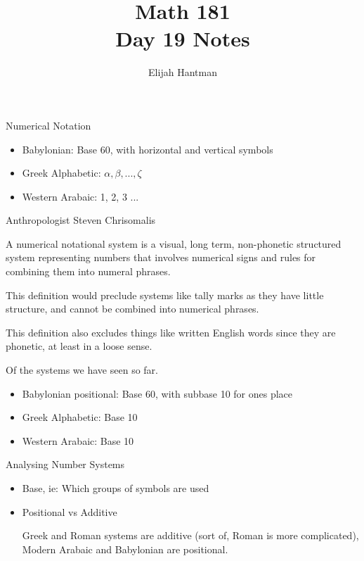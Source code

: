 \documentclass{report}
\title{\Huge{Math 181}\\Day 19 Notes}
\author{\huge{Elijah Hantman}}
\date{}
\begin{document}
\maketitle
\newpage

\begin{description}
    \item {\large Numerical Notation} 
        \begin{mdframed}
           \begin{itemize}
               \item Babylonian: Base 60, with horizontal and vertical symbols
               \item Greek Alphabetic: $\alpha, \beta, ... , \zeta$
               \item Western Arabaic: 1, 2, 3 ... 
           \end{itemize} 

           Anthropologist Steven Chrisomalis
           \begin{mdframed}
              A numerical notational system is a visual,
              long term, non-phonetic structured system
              representing numbers that involves numerical
              signs and rules for combining them into
              numeral phrases.
           \end{mdframed}

           This definition would preclude systems like tally
           marks as they have little structure, and cannot
           be combined into numerical phrases.

           This definition also excludes things like written
           English words since they are phonetic, at least
           in a loose sense.


           Of the systems we have seen so far.
           \begin{itemize}
               \item Babylonian positional: Base 60, with subbase 10 for ones place
               \item Greek Alphabetic: Base 10
               \item Western Arabaic: Base 10
           \end{itemize}
        \end{mdframed}
    \item {\large Analysing Number Systems}
        \begin{mdframed}
            \begin{itemize}
                \item Base, ie: Which groups of symbols are used
                \item Positional vs Additive
                    \begin{mdframed}
                        Greek and Roman systems are additive
                        (sort of, Roman is more complicated),
                        Modern Arabaic and Babylonian are
                        positional.


\end{mdframed}
\end{itemize}
\end{mdframed}
\end{description}
\end{document}
